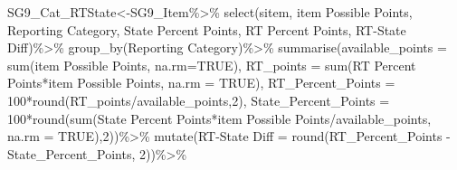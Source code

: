 \documentclass[
  letterpaper,
  DIV=11,
  numbers=noendperiod]{scrartcl}
\newenvironment{Shaded}{\begin{snugshade}}{\end{snugshade}}
\newcommand{\AttributeTok}[1]{\textcolor[rgb]{0.40,0.45,0.13}{#1}}
\newcommand{\ConstantTok}[1]{\textcolor[rgb]{0.56,0.35,0.01}{#1}}
\newcommand{\DecValTok}[1]{\textcolor[rgb]{0.68,0.00,0.00}{#1}}
\newcommand{\FunctionTok}[1]{\textcolor[rgb]{0.28,0.35,0.67}{#1}}
\newcommand{\NormalTok}[1]{\textcolor[rgb]{0.00,0.23,0.31}{#1}}
\newcommand{\OtherTok}[1]{\textcolor[rgb]{0.00,0.23,0.31}{#1}}
\newcommand{\SpecialCharTok}[1]{\textcolor[rgb]{0.37,0.37,0.37}{#1}}
\newcommand{\StringTok}[1]{\textcolor[rgb]{0.13,0.47,0.30}{#1}}
\begin{document}
\begin{Shaded}
\begin{Highlighting}[]
\NormalTok{SG9\_Cat\_RTState}\OtherTok{\textless{}{-}}\NormalTok{SG9\_Item}\SpecialCharTok{\%\textgreater{}\%}
  \FunctionTok{select}\NormalTok{(}\StringTok{\textasciigrave{}}\AttributeTok{sitem}\StringTok{\textasciigrave{}}\NormalTok{, }\StringTok{\textasciigrave{}}\AttributeTok{item Possible Points}\StringTok{\textasciigrave{}}\NormalTok{, }\StringTok{\textasciigrave{}}\AttributeTok{Reporting Category}\StringTok{\textasciigrave{}}\NormalTok{, }\StringTok{\textasciigrave{}}\AttributeTok{State Percent Points}\StringTok{\textasciigrave{}}\NormalTok{, }\StringTok{\textasciigrave{}}\AttributeTok{RT Percent Points}\StringTok{\textasciigrave{}}\NormalTok{, }\StringTok{\textasciigrave{}}\AttributeTok{RT{-}State Diff}\StringTok{\textasciigrave{}}\NormalTok{)}\SpecialCharTok{\%\textgreater{}\%}
  \FunctionTok{group\_by}\NormalTok{(}\StringTok{\textasciigrave{}}\AttributeTok{Reporting Category}\StringTok{\textasciigrave{}}\NormalTok{)}\SpecialCharTok{\%\textgreater{}\%}
  \FunctionTok{summarise}\NormalTok{(}\AttributeTok{available\_points =} \FunctionTok{sum}\NormalTok{(}\StringTok{\textasciigrave{}}\AttributeTok{item Possible Points}\StringTok{\textasciigrave{}}\NormalTok{, }\AttributeTok{na.rm=}\ConstantTok{TRUE}\NormalTok{),}
            \AttributeTok{RT\_points =} \FunctionTok{sum}\NormalTok{(}\StringTok{\textasciigrave{}}\AttributeTok{RT Percent Points}\StringTok{\textasciigrave{}}\SpecialCharTok{*}\StringTok{\textasciigrave{}}\AttributeTok{item Possible Points}\StringTok{\textasciigrave{}}\NormalTok{, }\AttributeTok{na.rm =} \ConstantTok{TRUE}\NormalTok{),}
            \AttributeTok{RT\_Percent\_Points =} \DecValTok{100}\SpecialCharTok{*}\FunctionTok{round}\NormalTok{(RT\_points}\SpecialCharTok{/}\NormalTok{available\_points,}\DecValTok{2}\NormalTok{),}
            \AttributeTok{State\_Percent\_Points =} \DecValTok{100}\SpecialCharTok{*}\FunctionTok{round}\NormalTok{(}\FunctionTok{sum}\NormalTok{(}\StringTok{\textasciigrave{}}\AttributeTok{State Percent Points}\StringTok{\textasciigrave{}}\SpecialCharTok{*}\StringTok{\textasciigrave{}}\AttributeTok{item Possible Points}\StringTok{\textasciigrave{}}\SpecialCharTok{/}\NormalTok{available\_points, }\AttributeTok{na.rm =} \ConstantTok{TRUE}\NormalTok{),}\DecValTok{2}\NormalTok{))}\SpecialCharTok{\%\textgreater{}\%}
  \FunctionTok{mutate}\NormalTok{(}\StringTok{\textasciigrave{}}\AttributeTok{RT{-}State Diff}\StringTok{\textasciigrave{}} \OtherTok{=} \FunctionTok{round}\NormalTok{(RT\_Percent\_Points }\SpecialCharTok{{-}}\NormalTok{ State\_Percent\_Points, }\DecValTok{2}\NormalTok{))}\SpecialCharTok{\%\textgreater{}\%}

\end{Highlighting}
\end{Shaded}
\end{document}
